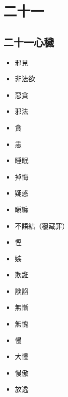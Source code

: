 \section{二十一}

\subsection{二十一心穢}
\begin{itemize}
  \item 邪見  \item 非法欲  \item 惡貪  \item 邪法  \item 貪  \item 恚  \item 睡眠  \item 掉悔  \item 疑惑  \item 瞋纏  \item 不語結（覆藏罪）  \item 慳  \item 嫉  \item 欺誑  \item 諛諂  \item 無慚  \item 無愧  \item 慢  \item 大慢  \item 慢傲  \item 放逸
\end{itemize}
